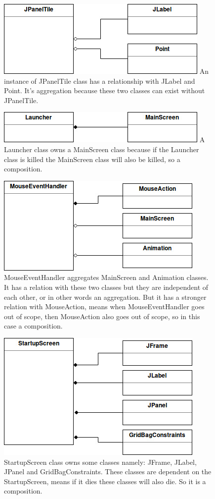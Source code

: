 \documentclass{article}
\begin{document}
\begin{figure}[H]
\includegraphics[scale=0.95]{Images/JPanelTile.jpg} 
An instance of JPanelTile class has a relationship with JLabel and Point. It's aggregation because these two classes can exist without JPanelTile.
\end{figure}

\begin{figure}[H]
\includegraphics[scale=0.95]{Images/Launcher.jpg} 
A Launcher class owns a MainScreen class because if the Launcher class is killed the MainScreen class will also be killed, so a composition.
\end{figure}

\begin{figure}[H]
\includegraphics[scale=0.97]{Images/MouseEventHandler.jpg} 
MouseEventHandler aggregates MainScreen and Animation classes. It has a relation with these two classes but they are independent of each other, or in other words an aggregation. But it has a stronger relation with MouseAction, means when MouseEventHandler goes out of scope, then MouseAction also goes out of scope, so in this case a composition.
\end{figure}

\begin{figure}[H]
\includegraphics[scale=0.95]{Images/StartupScreen.jpg} 
StartupScreen class owns some classes namely: JFrame, JLabel, JPanel and GridBagConstraints. These classes are dependent on the StartupScreen, means if it dies these classes will also die. So it is a composition.
\end{figure}
\end{document}
